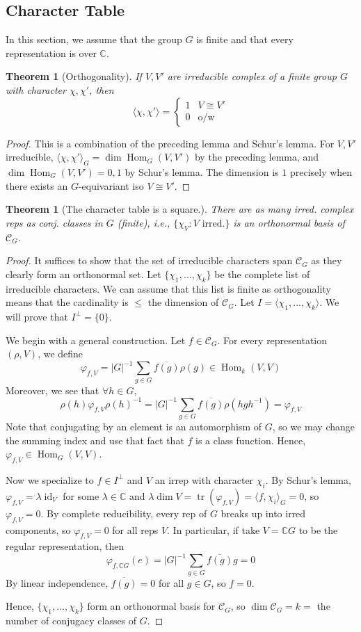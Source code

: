 \documentclass{article}
\theoremstyle{definition}
\theoremstyle{remark}
\theoremstyle{plain}
\newtheorem{thm}[defn]{Theorem}
\newcommand{\CC}{\mathbb{C}}
\newcommand{\Hom}{\operatorname{Hom}}
\newcommand{\id}{\operatorname{id}}
\begin{document}
\subsection{Character Table}
In this section, we assume that the group $G$ is finite and that every representation is over $\CC$.
\begin{thm}[Orthogonality]
    If $V,V'$ are irreducible complex of a finite group $G$ with character $\chi,\chi'$, then
    \[\langle\chi,\chi'\rangle=\begin{cases}
        1 & V\cong V'\\
        0 & \text{o/w}
    \end{cases}\]
\end{thm}
\begin{proof}
    This is a combination of the preceding lemma and Schur's lemma. For $V,V'$ irreducible, $\langle \chi,\chi'\rangle_G=\dim\Hom_G(V,V')$ by the preceding lemma, and $\dim\Hom_G(V,V')=0,1$ by Schur's lemma. The dimension is $1$ precisely when there exists an $G$-equivariant iso $V\cong V'$.
\end{proof} 
\begin{thm}[The character table is a square.]
    There are as many irred. complex reps as conj. classes in $G$ (finite), i.e., $\{\chi_V: V\text{ irred.}\}$ is an orthonormal basis of $\mathcal{C}_G$.
\end{thm}
\begin{proof}
    It suffices to show that the set of irreducible characters span $\mathcal{C}_G$ as they clearly form an orthonormal set. Let $\{\chi_1,...,\chi_k\}$ be the complete list of irreducible characters. We can assume that this list is finite as orthogonality means that the cardinality is $\le$ the dimension of $\mathcal{C}_G$. Let $I=\langle\chi_1,...,\chi_k\rangle$. We will prove that $I^\perp=\{0\}$.

    We begin with a general construction. Let $f\in\mathcal{C}_G$. For every representation $(\rho,V)$, we define
    \[\varphi_{f,V}=|G|^{-1}\sum_{g\in G}\overline{f(g)}\rho(g)\in\Hom_k(V,V)\]
    Moreover, we see that $\forall h\in G$,
    \[\rho(h)\varphi_{f,V}\rho(h)^{-1}=|G|^{-1}\sum_{g\in G}\overline{f(g)}\rho(hgh^{-1})=\varphi_{f,V}\]
    Note that conjugating by an element is an automorphism of $G$, so we may change the summing index and use that fact that $f$ is a class function. Hence, $\varphi_{f,V}\in\Hom_G(V,V)$.

    Now we specialize to $f\in I^\perp$ and $V$ an irrep with character $\chi_i$. By Schur's lemma, $\varphi_{f,V}=\lambda\id_V$ for some $\lambda\in\CC$ and $\lambda\dim V=\operatorname{tr}(\varphi_{f,V})=\langle f,\chi_i\rangle_G=0$, so $\varphi_{f,V}=0$. By complete reducibility, every rep of $G$ breaks up into irred components, so $\varphi_{f,V}=0$ for all reps $V$. In particular, if take $V=\CC G$ to be the regular representation, then 
    \[\varphi_{f,\CC G}(e)=|G|^{-1}\sum_{g\in G}\overline{f(g)}g=0\]
    By linear independence, $\overline{f(g)}=0$ for all $g\in G$, so $f=0$.

    Hence, $\{\chi_1,...,\chi_k\}$ form an orthonormal basis for $\mathcal{C}_G$, so $\dim \mathcal{C}_G=k=$ the number of conjugacy classes of $G$.
\end{proof}
\end{document}
